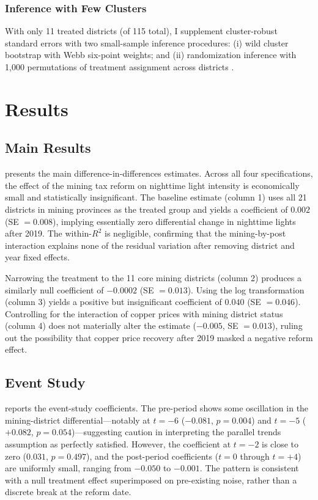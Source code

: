 \documentclass[12pt]{article}
\begin{document}
\subsubsection*{Inference with Few Clusters} With only 11 treated districts (of 115 total), I supplement cluster-robust standard errors with two small-sample inference procedures: (i) wild cluster bootstrap with Webb six-point weights; and (ii) randomization inference with 1,000 permutations of treatment assignment across districts \citep{fisher1935design}.

\section{Results}
\label{sec:results}

\subsection{Main Results}

 presents the main difference-in-differences estimates. Across all four specifications, the effect of the mining tax reform on nighttime light intensity is economically small and statistically insignificant. The baseline estimate (column 1) uses all 21 districts in mining provinces as the treated group and yields a coefficient of $0.002$ (SE $= 0.008$), implying essentially zero differential change in nighttime lights after 2019. The within-$R^2$ is negligible, confirming that the mining-by-post interaction explains none of the residual variation after removing district and year fixed effects.



Narrowing the treatment to the 11 core mining districts (column 2) produces a similarly null coefficient of $-0.0002$ (SE $= 0.013$). Using the log transformation (column 3) yields a positive but insignificant coefficient of $0.040$ (SE $= 0.046$). Controlling for the interaction of copper prices with mining district status (column 4) does not materially alter the estimate ($-0.005$, SE $= 0.013$), ruling out the possibility that copper price recovery after 2019 masked a negative reform effect.

\subsection{Event Study}

 reports the event-study coefficients. The pre-period shows some oscillation in the mining-district differential---notably at $t = -6$ ($-0.081$, $p = 0.004$) and $t = -5$ ($+0.082$, $p = 0.054$)---suggesting caution in interpreting the parallel trends assumption as perfectly satisfied. However, the coefficient at $t = -2$ is close to zero ($0.031$, $p = 0.497$), and the post-period coefficients ($t = 0$ through $t = +4$) are uniformly small, ranging from $-0.050$ to $-0.001$. The pattern is consistent with a null treatment effect superimposed on pre-existing noise, rather than a discrete break at the reform date.
\end{document}

